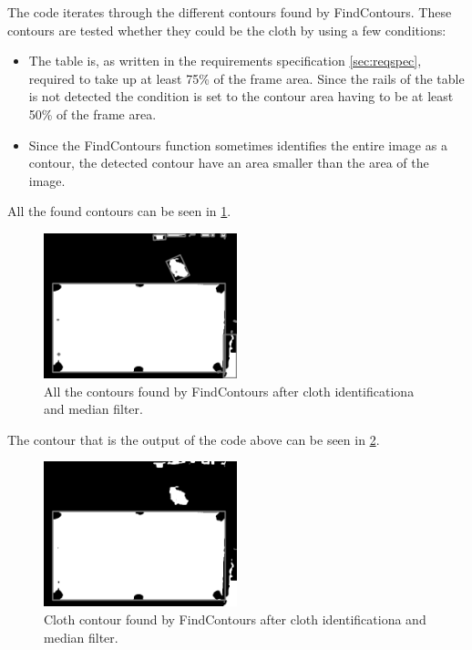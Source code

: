 The code iterates through the different contours found by FindContours. These contours are tested whether they could be the cloth by using a few conditions:

\begin{itemize}
\setlength{\itemsep}{0mm}
	\item The table is, as written in the requirements specification \ref{sec:reqspec}, required to take up at least 75\% of the frame area. Since the rails of the table is not detected the condition is set to the contour area having to be at least 50\% of the frame area. 
	\item Since the FindContours function sometimes identifies the entire image as a contour, the detected contour have an area smaller than the area of the image.
\end{itemize}

All the found contours can be seen in \ref{fig:allcontours}.
\begin{figure}[H]
\begin{center}
\leavevmode
\includegraphics[width=0.5\textwidth]{images/allcontours}
\end{center}
\caption{All the contours found by FindContours after cloth identificationa and median filter.}
\label{fig:allcontours}
\end{figure}

The contour that is the output of the code above can be seen in \ref{fig:clothcontour}.
\begin{figure}[H]
\begin{center}
\leavevmode
\includegraphics[width=0.5\textwidth]{images/clothcontour}
\end{center}
\caption{Cloth contour found by FindContours after cloth identificationa and median filter.}
\label{fig:clothcontour}
\end{figure}

